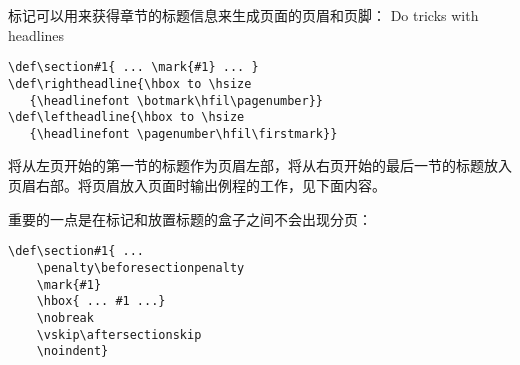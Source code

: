 \documentclass{book}
\begin{document}
\begin{example}
标记可以用来获得章节的标题信息来生成页面的页眉和页脚：
\howto Do tricks with headlines\par

\begin{verbatim}
\def\section#1{ ... \mark{#1} ... }
\def\rightheadline{\hbox to \hsize
   {\headlinefont \botmark\hfil\pagenumber}}
\def\leftheadline{\hbox to \hsize
   {\headlinefont \pagenumber\hfil\firstmark}}
\end{verbatim}

将从左页开始的第一节的标题作为页眉左部，将从右页开始的最后一节的标题放入页眉右部。将页眉放入页面时输出例程的工作，见下面内容。

重要的一点是在标记和放置标题的盒子之间不会出现分页：

\begin{verbatim}
\def\section#1{ ...
    \penalty\beforesectionpenalty
    \mark{#1}
    \hbox{ ... #1 ...}
    \nobreak
    \vskip\aftersectionskip
    \noindent}
\end{verbatim}
\end{example}
\end{document}
